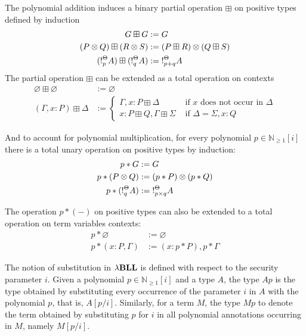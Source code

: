 The polynomial addition induces a binary partial operation $\boxplus$ on positive types defined by induction
\begin{align*}
	G \boxplus G &:= G\\
	(P \otimes Q) \boxplus(R \otimes S) &:= (P \boxplus R) \otimes (Q \boxplus S) \\
	(\mathord{!}_p^{\Theta} A) \boxplus (\mathord{!}_q^{\Theta}  A) &:= \mathord{!}_{p+q}^{\Theta}  A
\end{align*}
The partial operation $\boxplus$ can be extended as a total operation on contexts
\begin{align*}
	\varnothing \boxplus \varnothing&:= \varnothing \\
	(\Gamma, x:P) \boxplus \Delta & := \begin{cases}
		\Gamma, x: P \boxplus \Delta & \text{ if } x \text{ does not occur in } \Delta \\
		x : P \boxplus Q, \Gamma \boxplus \Sigma & \text{ if } \Delta = \Sigma, x: Q
	\end{cases}
\end{align*}

And to account for polynomial multiplication, for every polynomial $p \in \mathbb{N}_{\geq 1}[i]$ there is a total unary operation on positive types by induction:
\begin{align*}
	p * G &:= G\\
	p * (P \otimes Q)  &:= (p * P) \otimes (p * Q) \\
	p * (\mathord{!}_q^{\Theta}  A) &:= \mathord{!}_{p\times q}^{ \Theta}  A
\end{align*}

The operation $p * (-)$ on positive types can also be extended to a total operation on term variables contexts:
\[\begin{aligned}
	p \ast \varnothing &:= \varnothing\\
	p \ast  (x : P,\Gamma )&:= (x : p \ast P),  p\ast \Gamma 
\end{aligned}\]

The notion of substitution in ${\lambda}\mathbf{BLL}$ is defined with respect to the security parameter $i$. Given a polynomial $p \in \mathbb{N}_{\geq 1}[i]$ and a type $A$, the type $Ap$ is the type obtained by substituting every occurrence of the parameter $i$ in $A$ with the polynomial $p$, that is, $A[p/i]$. Similarly, for a term $M$, the type $Mp$ to denote the term obtained by substituting $p$ for $i$ in all polynomial annotations occurring in $M$, namely $M[p/i]$. 


